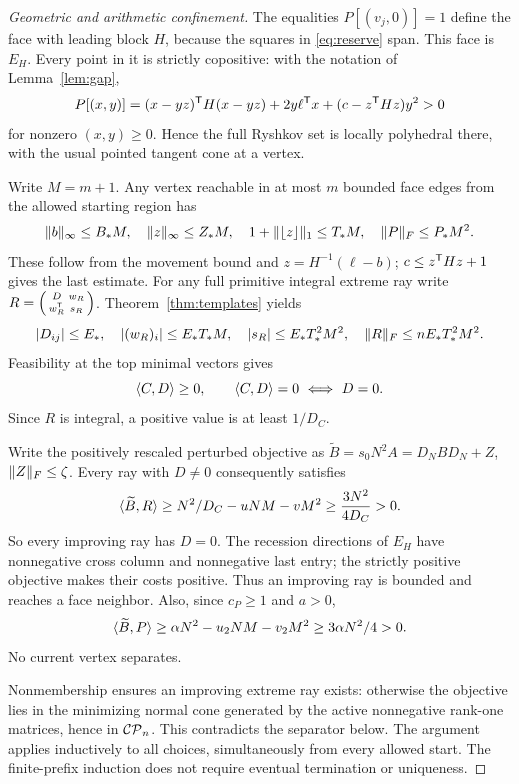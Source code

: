 \begin{proof}[Geometric and arithmetic confinement]
The equalities $P[(v_j,0)]=1$ define the face with leading block $H$, because the squares in \eqref{eq:reserve} span. This face is $E_H$. Every point in it is strictly copositive: with the notation of Lemma~\ref{lem:gap},
\[
 P[(x,y)]=(x-yz)^{\mathsf T} H(x-yz)+2y\ell^{\mathsf T} x+(c-z^{\mathsf T} Hz)y^2>0
\]
for nonzero $(x,y)\ge0$. Hence the full Ryshkov set is locally polyhedral there, with the usual pointed tangent cone at a vertex.

Write $M=m+1$. Any vertex reachable in at most $m$ bounded face edges from the allowed starting region has
\[
 \lVert b\rVert_\infty\le B_*M,\quad \lVert z\rVert_\infty\le Z_*M,\quad
 1+\lVert \lfloor z\rfloor\rVert_1\le T_*M,\quad \lVert P\rVert_F\le P_*M^2.
\]
These follow from the movement bound and $z=H^{-1}(\ell-b)$; $c\le z^{\mathsf T} Hz+1$ gives the last estimate. For any full primitive integral extreme ray write $R=\left(\begin{smallmatrix}D&w_R\\w_R^{\mathsf T}&s_R\end{smallmatrix}\right)$. Theorem~\ref{thm:templates} yields
\[
 |D_{ij}|\le E_*,\quad |(w_R)_i|\le E_*T_*M,\quad
 |s_R|\le E_*T_*^2M^2,\quad \lVert R\rVert_F\le nE_*T_*^2M^2.
\]
Feasibility at the top minimal vectors gives
\[
 \ip C D\ge0,\qquad \ip C D=0\ \Longleftrightarrow\ D=0.
\]
Since $R$ is integral, a positive value is at least $1/D_C$.

Write the positively rescaled perturbed objective as
$\widetilde B=s_0N^2A=D_NBD_N+Z$, $\lVert Z\rVert_F\le\zeta$.
Every ray with $D\ne0$ consequently satisfies
\[
 \langle \widetilde B,R\rangle\ge N^2/D_C-uNM-vM^2
 \ge\frac{3N^2}{4D_C}>0.
\]
So every improving ray has $D=0$. The recession directions of $E_H$ have nonnegative cross column and nonnegative last entry; the strictly positive objective makes their costs positive. Thus an improving ray is bounded and reaches a face neighbor. Also, since $c_P\ge1$ and $a>0$,
\[
 \langle \widetilde B,P\rangle\ge\alpha N^2-u_2NM-v_2M^2
 \ge3\alpha N^2/4>0.
\]
No current vertex separates.

Nonmembership ensures an improving extreme ray exists: otherwise the objective lies in the minimizing normal cone generated by the active nonnegative rank-one matrices, hence in $\mathcal{CP}_n$. This contradicts the separator below. The argument applies inductively to all choices, simultaneously from every allowed start. The finite-prefix induction does not require eventual termination or uniqueness.
\end{proof}

